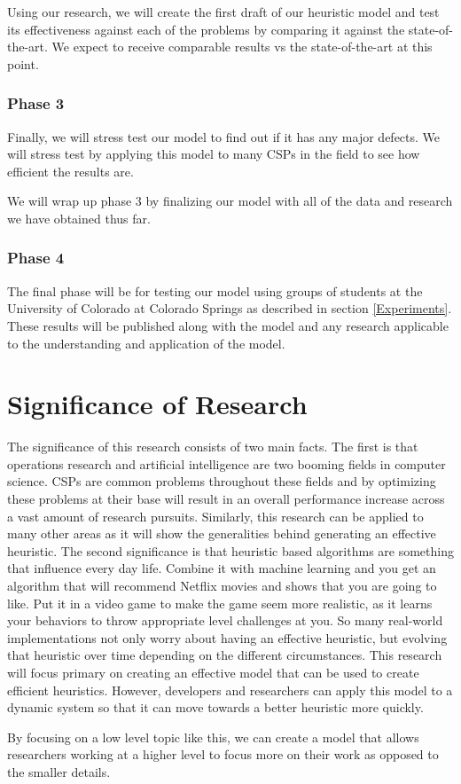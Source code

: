 \documentclass[10pt,twoside]{IEEEtran}
\begin{document}
Using our research, we will create the first draft of our heuristic model and test its effectiveness against each of the problems by comparing it against the state-of-the-art. We expect to receive comparable results vs the state-of-the-art at this point.
\subsubsection{Phase 3}
Finally, we will stress test our model to find out if it has any major defects. We will stress test by applying this model to many CSPs in the field to see how efficient the results are.

We will wrap up phase 3 by finalizing our model with all of the data and research we have obtained thus far.

\subsubsection{Phase 4}
The final phase will be for testing our model using groups of students at the University of Colorado at Colorado Springs as described in section \ref{Experiments}. These results will be published along with the model and any research applicable to the understanding and application of the model.

\section{Significance of Research}
The significance of this research consists of two main facts. The first is that operations research and artificial intelligence are two booming fields in computer science. CSPs are common problems throughout these fields and by optimizing these problems at their base will result in an overall performance increase across a vast amount of research pursuits. Similarly, this research can be applied to many other areas as it will show the generalities behind generating an effective heuristic. The second significance is that heuristic based algorithms are something that influence every day life. Combine it with machine learning and you get an algorithm that will recommend Netflix movies and shows that you are going to like. Put it in a video game to make the game seem more realistic, as it learns your behaviors to throw appropriate level challenges at you. So many real-world implementations not only worry about having an effective heuristic, but evolving that heuristic over time depending on the different circumstances. This research will focus primary on creating an effective model that can be used to create efficient heuristics. However, developers and researchers can apply this model to a dynamic system so that it can move towards a better heuristic more quickly. 

By focusing on a low level topic like this, we can create a model that allows researchers working at a higher level to focus more on their work as opposed to the smaller details.

\nocite{*}


\end{document}
